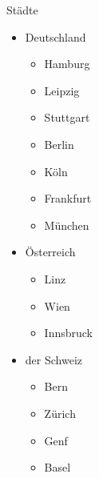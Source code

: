 \begin{semantics}{Städte}{}
\begin{itemize}
	\item Deutschland
		\begin{itemize}
			\item Hamburg
			\item Leipzig
			\item Stuttgart
			\item Berlin
			\item Köln
			\item Frankfurt
			\item München
		\end{itemize}
	\item Österreich
		\begin{itemize}
			\item Linz
			\item Wien
			\item Innsbruck
		\end{itemize}
	\item der Schweiz
		\begin{itemize}
			\item Bern
			\item Zürich
			\item Genf
			\item Basel
		\end{itemize}
\end{itemize}
\end{semantics}
